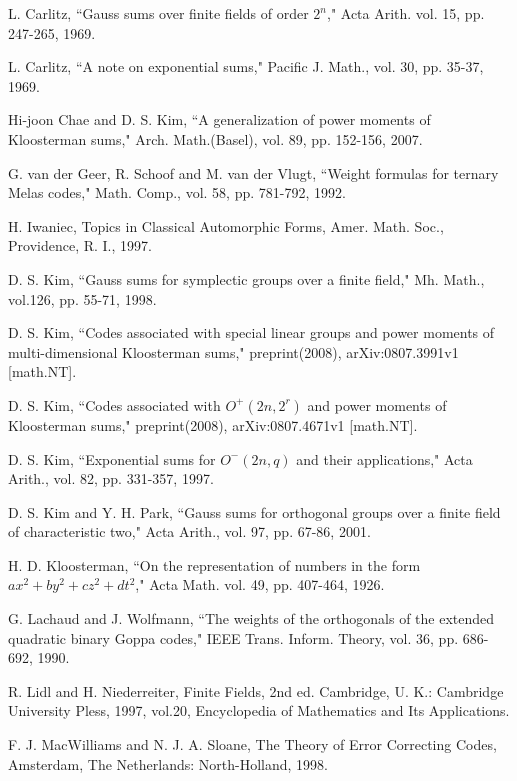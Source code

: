 \documentclass[a4,12pt]{elsart}
\begin{document}
\begin{thebibliography}{9}

L. Carlitz, ``Gauss sums over finite fields of order $2^n$," Acta
Arith. vol. 15, pp. 247-265, 1969.

L. Carlitz, ``A note on exponential sums," Pacific J. Math., vol.
30, pp. 35-37, 1969.

Hi-joon Chae and D. S. Kim, ``A generalization of power moments of
Kloosterman sums," Arch. Math.(Basel), vol. 89, pp. 152-156, 2007.

G. van der Geer, R. Schoof and M. van der Vlugt, ``Weight formulas
for ternary Melas codes," Math. Comp., vol. 58, pp. 781-792, 1992.

H. Iwaniec, Topics in Classical Automorphic Forms, Amer. Math. Soc.,
Providence, R. I., 1997.

D. S. Kim, ``Gauss sums for symplectic groups over a finite field,"
Mh. Math., vol.126, pp. 55-71, 1998.

D. S. Kim, ``Codes associated with special linear groups and power
moments of multi-dimensional Kloosterman sums," preprint(2008),
arXiv:0807.3991v1 [math.NT].

D. S. Kim, ``Codes associated with $O^{+}(2n,2^r)$ and power moments
of Kloosterman sums," preprint(2008), arXiv:0807.4671v1 [math.NT].

D. S. Kim, ``Exponential sums for $O^{-}(2n,q)$ and their
applications," Acta Arith., vol. 82, pp. 331-357, 1997.

D. S. Kim and Y. H. Park, ``Gauss sums for orthogonal groups over a
finite field of characteristic two," Acta Arith., vol. 97, pp.
67-86, 2001.

H. D. Kloosterman, ``On the representation of numbers in the form
$ax^{2}+by^{2}+cz^{2}+dt^{2}$," Acta Math. vol. 49, pp. 407-464,
1926.

G. Lachaud and J. Wolfmann, ``The weights of the orthogonals of the
extended quadratic binary Goppa codes," IEEE Trans. Inform. Theory,
vol. 36, pp. 686-692, 1990.

R. Lidl and H. Niederreiter, Finite Fields, 2nd ed. Cambridge, U.
K.: Cambridge University Pless, 1997, vol.20, Encyclopedia of
Mathematics and Its Applications.

F. J. MacWilliams and N. J. A. Sloane, The Theory of Error
Correcting Codes, Amsterdam, The Netherlands: North-Holland, 1998.


\end{thebibliography}
\end{document}
